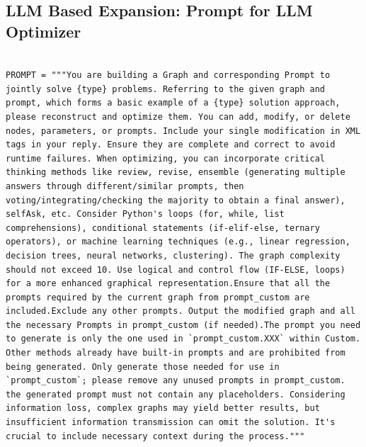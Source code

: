 \setcounter{table}{0}  
\setcounter{figure}{0}
\setcounter{algorithm}{0}
\renewcommand{\thetable}{A\arabic{table}}
\renewcommand{\thefigure}{A\arabic{figure}}


\subsection{LLM Based Expansion: Prompt for LLM Optimizer}
\label{appendix:prompt}

\begin{tcolorbox}[title={\textbf{\small Workflow optimize prompt}}, boxrule=2pt, arc=0mm, breakable]\begin{verbatim}

PROMPT = """You are building a Graph and corresponding Prompt to jointly solve {type} problems. Referring to the given graph and prompt, which forms a basic example of a {type} solution approach, please reconstruct and optimize them. You can add, modify, or delete nodes, parameters, or prompts. Include your single modification in XML tags in your reply. Ensure they are complete and correct to avoid runtime failures. When optimizing, you can incorporate critical thinking methods like review, revise, ensemble (generating multiple answers through different/similar prompts, then voting/integrating/checking the majority to obtain a final answer), selfAsk, etc. Consider Python's loops (for, while, list comprehensions), conditional statements (if-elif-else, ternary operators), or machine learning techniques (e.g., linear regression, decision trees, neural networks, clustering). The graph complexity should not exceed 10. Use logical and control flow (IF-ELSE, loops) for a more enhanced graphical representation.Ensure that all the prompts required by the current graph from prompt_custom are included.Exclude any other prompts. Output the modified graph and all the necessary Prompts in prompt_custom (if needed).The prompt you need to generate is only the one used in `prompt_custom.XXX` within Custom. Other methods already have built-in prompts and are prohibited from being generated. Only generate those needed for use in `prompt_custom`; please remove any unused prompts in prompt_custom. the generated prompt must not contain any placeholders. Considering information loss, complex graphs may yield better results, but insufficient information transmission can omit the solution. It's crucial to include necessary context during the process."""
\end{verbatim}
\end{tcolorbox}

